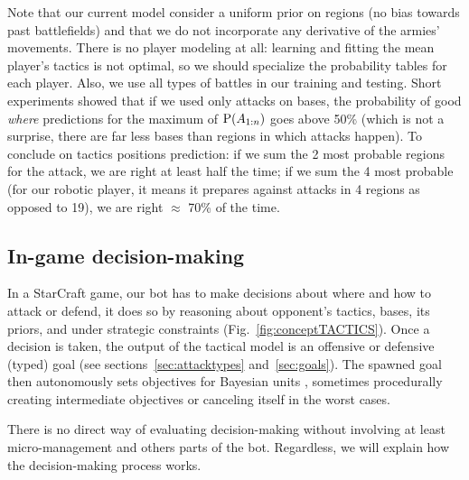 Note that our current model consider a uniform prior on regions (no bias towards past battlefields) and that we do not incorporate any derivative of the armies' movements. There is no player modeling at all: learning and fitting the mean player's tactics is not optimal, so we should specialize the probability tables for each player. Also, we use all types of battles in our training and testing. Short experiments showed that if we used only attacks on bases, the probability of good \textit{where} predictions for the maximum of $\mathrm{P}(A_{1:n})$ goes above 50\% (which is not a surprise, there are far less bases than regions in which attacks happen). To conclude on tactics positions prediction: if we sum the 2 most probable regions for the attack, we are right at least half the time; if we sum the 4 most probable (for our robotic player, it means it prepares against attacks in 4 regions as opposed to 19), we are right $\approx$ 70\% of the time.

\subsection{In-game decision-making}

In a StarCraft game, our bot has to make decisions about where and how to attack or defend, it does so by reasoning about opponent's tactics, bases, its priors, and under strategic constraints (Fig.~\ref{fig:conceptTACTICS}). Once a decision is taken, the output of the tactical model is an offensive or defensive (typed) goal (see sections~\ref{sec:attacktypes} and~\ref{sec:goals}). %
The spawned goal then autonomously sets objectives for Bayesian units \cite{SYNNAEVE:Micro}, sometimes procedurally creating intermediate objectives or canceling itself in the worst cases. 

There is no direct way of evaluating decision-making without involving at least micro-management and others parts of the bot. Regardless, we will explain how the decision-making process works.

